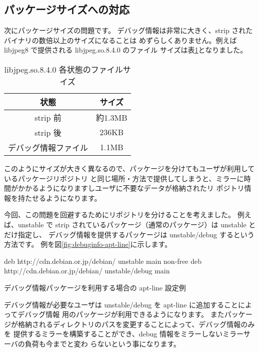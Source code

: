 \documentclass[mingoth,a4paper]{jsarticle}
\begin{document}
\subsection{パッケージサイズへの対応}

次にパッケージサイズの問題です。
デバッグ情報は非常に大きく、strip されたバイナリの数倍以上のサイズになることは
めずらしくありません。例えば libjpeg8 で提供される libjpeg.so.8.4.0 のファイル
サイズは表\ref{tab:debuginfo-jpegsize}となりました。

\begin{table}[ht]
 \caption{libjpeg.so.8.4.0 各状態のファイルサイズ}
 \label{tab:debuginfo-jpegsize}
\begin{center}
  \begin{tabular}{|c|c|}
 \hline
 状態 & サイズ \\
 \hline
 strip 前 & 約1.3MB \\
 strip 後 & 236KB \\
 デバッグ情報ファイル & 1.1MB \\
 \hline
 \end{tabular}
\end{center}
\end{table}

このようにサイズが大きく異なるので、パッケージを分けてもユーザが利用しているパッケージリポジトリ
と同じ場所・方法で提供してしまうと、ミラーに時間がかかるようになりますしユーザに不要なデータが格納されたリ
ポジトリ情報を持たせるようになります。

今回、この問題を回避するためにリポジトリを分けることを考えました。
例えば、unstable で strip されているパッケージ（通常のパッケージ）は unstable とだけ指定し、
デバッグ情報を提供するパッケージは unstable/debug するという方法です。
例を図\ref{fig:debuginfo-apt-line}に示します。

\begin{table}[ht]
\begin{center}
\begin{commandline}
deb http://cdn.debian.or.jp/debian/ unstable main non-free
deb http://cdn.debian.or.jp/debian/ unstable/debug main 
\end{commandline}
\end{center}
 \caption{デバッグ情報パッケージを利用する場合の apt-line 設定例}
 \label{fig:debuginfo-apt-line}
\end{table}


デバッグ情報が必要なユーザは unstable/debug を apt-line に追加することによってデバッグ情報
用のパッケージが利用できるようになります。
またパッケージが格納されるディレクトリのパスを変更することによって、デバッグ情報のみを
提供するミラーを構築することができ、debug 情報をミラーしないミラーサーバの負荷も今までと変わ
らないという事になります。
\end{document}
